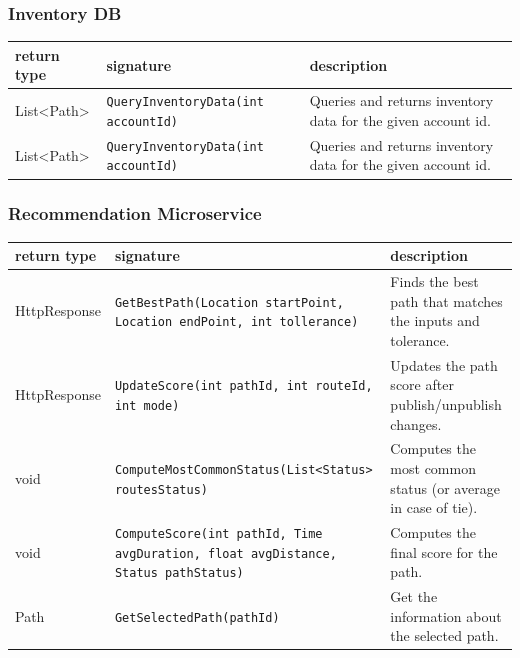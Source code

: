 \subsubsection{Inventory DB}
\begin{table}[H]
\centering
\small
\begin{tabularx}{\textwidth}{|L{3cm}|L{6.5cm}|Y|}
\hline
\textbf{return type} & \textbf{signature} & \textbf{description} \\
\hline
List<Path> & \texttt{QueryInventoryData(int accountId)} & Queries and returns inventory data for the given account id. \\
\hline
List<Path> & \texttt{QueryInventoryData(int accountId)} & Queries and returns inventory data for the given account id. \\
\hline
\end{tabularx}
\end{table}
\subsubsection{Recommendation Microservice}
\begin{table}[H]
\centering
\small
\begin{tabularx}{\textwidth}{|L{3cm}|L{6.5cm}|Y|}
\hline
\textbf{return type} & \textbf{signature} & \textbf{description} \\
\hline
HttpResponse & \texttt{GetBestPath(Location startPoint, Location endPoint, int tollerance)} & Finds the best path that matches the inputs and tolerance. \\
\hline
HttpResponse & \texttt{UpdateScore(int pathId, int routeId, int mode)} & Updates the path score after publish/unpublish changes. \\ \hline
void & \texttt{ComputeMostCommonStatus(List<Status> routesStatus)} & Computes the most common status (or average in case of tie). \\ \hline
void & \texttt{ComputeScore(int pathId, Time avgDuration, float avgDistance, Status pathStatus)} & Computes the final score for the path. \\ \hline
Path & \texttt{GetSelectedPath(pathId)} & Get the information about the selected path. \\ \hline
\end{tabularx}
\end{table}
